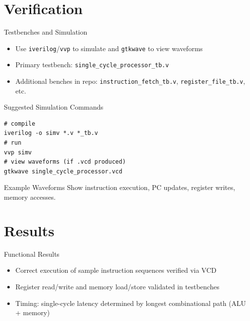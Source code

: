 \documentclass[aspectratio=169]{beamer}
\begin{document}
\section{Verification}
\begin{frame}[fragile]{Testbenches and Simulation}
  \begin{itemize}
    \item Use \texttt{iverilog}/\texttt{vvp} to simulate and \texttt{gtkwave} to view waveforms
    \item Primary testbench: \texttt{single\_cycle\_processor\_tb.v}
    \item Additional benches in repo: \texttt{instruction\_fetch\_tb.v}, \texttt{register\_file\_tb.v}, etc.
  \end{itemize}
  \vspace{0.5em}
  \begin{block}{Suggested Simulation Commands}
    \begin{verbatim}
# compile
iverilog -o simv *.v *_tb.v
# run
vvp simv
# view waveforms (if .vcd produced)
gtkwave single_cycle_processor.vcd
    \end{verbatim}
  \end{block}
\end{frame}

\begin{frame}{Example Waveforms}
  \centering
  \vspace{0.5em}
  {\small Show instruction execution, PC updates, register writes, memory accesses.}
\end{frame}

\section{Results}
\begin{frame}{Functional Results}
  \begin{itemize}
    \item Correct execution of sample instruction sequences verified via VCD
    \item Register read/write and memory load/store validated in testbenches
    \item Timing: single-cycle latency determined by longest combinational path (ALU + memory)
  \end{itemize}
\end{frame}
\end{document}
